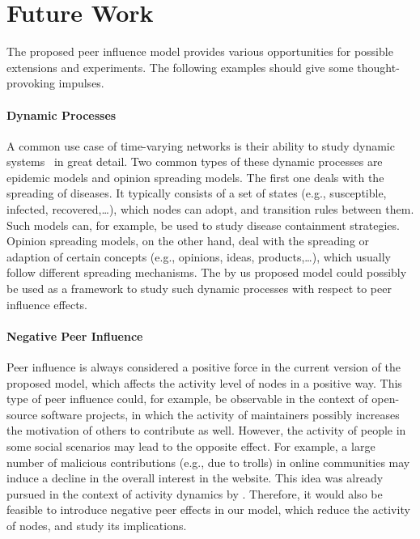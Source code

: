 

\section{Future Work}
\label{sec:future-work}

The proposed peer influence model provides various opportunities for possible extensions and experiments.
The following examples should give some thought-provoking impulses.

\paragraph{Dynamic Processes}
A common use case of time-varying networks is their ability to study dynamic systems~\cite{Holme2015} in great detail.
Two common types of these dynamic processes are epidemic models and opinion spreading models.
The first one deals with the spreading of diseases.
It typically consists of a set of states (e.g., susceptible, infected, recovered,\ldots), which nodes can adopt, and transition rules between them.
Such models can, for example, be used to study disease containment strategies.
Opinion spreading models, on the other hand, deal with the spreading or adaption of certain concepts (e.g., opinions, ideas, products,\ldots), which usually follow different spreading mechanisms.
The by us proposed model could possibly be used as a framework to study such dynamic processes with respect to peer influence effects.

\paragraph{Negative Peer Influence}
Peer influence is always considered a positive force in the current version of the proposed model, which affects the activity level of nodes in a positive way.
This type of peer influence could, for example, be observable in the context of open-source software projects, in which the activity of maintainers possibly increases the motivation of others to contribute as well.
However, the activity of people in some social scenarios may lead to the opposite effect.
For example, a large number of malicious contributions (e.g., due to trolls) in online communities may induce a decline in the overall interest in the website.
This idea was already pursued in the context of activity dynamics by \citet{Koncar2017}.
Therefore, it would also be feasible to introduce negative peer effects in our model, which reduce the activity of nodes, and study its implications.


